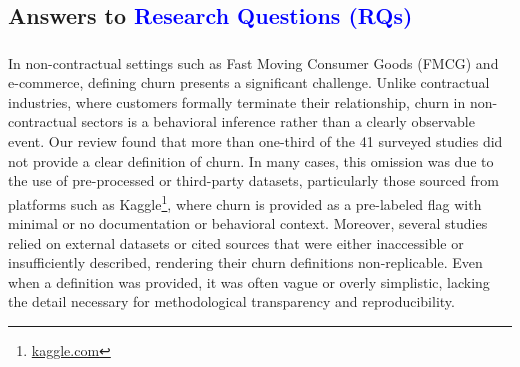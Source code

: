 \subsection{Answers to \textcolor{blue}{Research Questions (RQs)}}


\subsubsection{\RSRQone}
\label{sec:RQ1}

In non-contractual settings such as Fast Moving Consumer Goods (FMCG) and e-commerce, defining churn presents a significant challenge. Unlike contractual industries, where customers formally terminate their relationship, churn in non-contractual sectors is a behavioral inference rather than a clearly observable event. Our review found that more than one-third of the 41 surveyed studies did not provide a clear definition of churn. In many cases, this omission was due to the use of pre-processed or third-party datasets, particularly those sourced from platforms such as Kaggle\footnote{\url{kaggle.com}}, where churn is provided as a pre-labeled flag with minimal or no documentation or behavioral context. Moreover, several studies relied on external datasets or cited sources that were either inaccessible or insufficiently described, rendering their churn definitions non-replicable. Even when a definition was provided, it was often vague or overly simplistic, lacking the detail necessary for methodological transparency and reproducibility.

